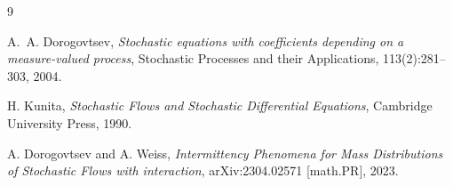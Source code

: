 \documentclass[12pt]{article}
\begin{document}
\vskip 2mm
\begingroup
\renewcommand{\section}[2]{}
\begin{thebibliography}{9}

    A.~A. Dorogovtsev,
    \textit{Stochastic equations with coefficients depending on a measure-valued process},
    Stochastic Processes and their Applications, 113(2):281--303, 2004.

    H. Kunita,
    \textit{Stochastic Flows and Stochastic Differential Equations},
    Cambridge University Press, 1990.

    A. Dorogovtsev and A. Weiss,
    \textit{Intermittency Phenomena for Mass Distributions of Stochastic Flows with interaction},
    arXiv:2304.02571 [math.PR], 2023.

\end{thebibliography}
\endgroup
\end{document}
